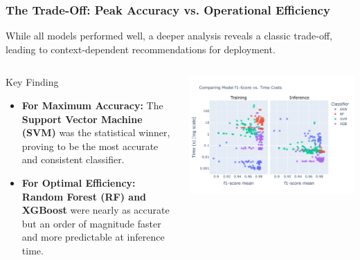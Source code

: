 \documentclass[aspectratio=169,10pt]{beamer}
\begin{document}
\begin{frame}
    \frametitle{The Trade-Off: Peak Accuracy vs. Operational Efficiency}
    
    While all models performed well, a deeper analysis reveals a classic trade-off, leading to context-dependent recommendations for deployment.
    
    \begin{columns}[T]
        \begin{column}{0.35\textwidth}
            \begin{alertblock}{Key Finding}
                \begin{itemize}
                    \item \textbf{For Maximum Accuracy:} The \textbf{Support Vector Machine (SVM)} was the statistical winner, proving to be the most accurate and consistent classifier.
                    
                    \item \textbf{For Optimal Efficiency:} \textbf{Random Forest (RF) and XGBoost} were nearly as accurate but an order of magnitude faster and more predictable at inference time.
                \end{itemize}
            \end{alertblock}
        \end{column}
        
        \begin{column}{0.6\textwidth}
            
            \centering
            \includegraphics[width=\textwidth]{Model_Score_vs_Time_Costs.pdf} %
            

\end{column}
\end{columns}
\end{frame}
\end{document}
